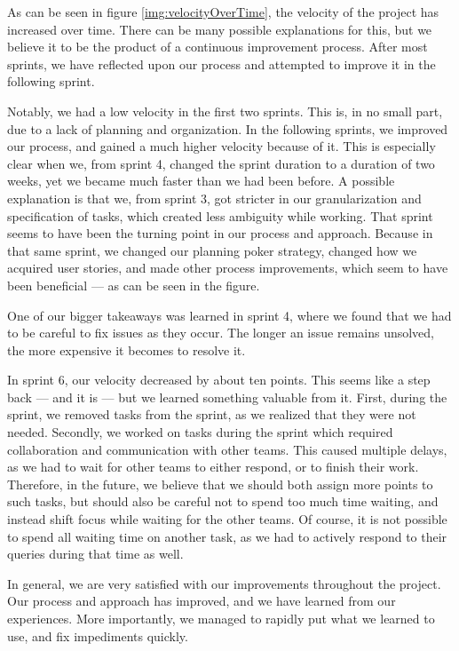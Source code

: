 As can be seen in figure \ref{img:velocityOverTime}, the velocity of the project has increased over time.
There can be many possible explanations for this, but we believe it to be the product of a continuous improvement process.
After most sprints, we have reflected upon our process and attempted to improve it in the following sprint.

Notably, we had a low velocity in the first two sprints. This is, in no small part, due to a lack of planning and organization. In the following sprints, we improved our process, and gained a much higher velocity because of it.
This is especially clear when we, from sprint 4, changed the sprint duration to a duration of two weeks, yet we became much faster than we had been before.
A possible explanation is that we, from sprint 3, got stricter in our granularization and specification of tasks, which created less ambiguity while working.
That sprint seems to have been the turning point in our process and approach. Because in that same sprint, we changed our planning poker strategy, changed how we acquired user stories, and made other process improvements, which seem to have been beneficial --- as can be seen in the figure.

One of our bigger takeaways was learned in sprint 4, where we found that we had to be careful to fix issues as they occur. The longer an issue remains unsolved, the more expensive it becomes to resolve it.

In sprint 6, our velocity decreased by about ten points. This seems like a step back --- and it is --- but we learned something valuable from it.
First, during the sprint, we removed tasks from the sprint, as we realized that they were not needed. 
Secondly, we worked on tasks during the sprint which required collaboration and communication with other teams. This caused multiple delays, as we had to wait for other teams to either respond, or to finish their work. Therefore, in the future, we believe that we should both assign more points to such tasks, but should also be careful not to spend too much time waiting, and instead shift focus while waiting for the other teams. Of course, it is not possible to spend all waiting time on another task, as we had to actively respond to their queries during that time as well.

In general, we are very satisfied with our improvements throughout the project. Our process and approach has improved, and we have learned from our experiences. More importantly, we managed to rapidly put what we learned to use, and fix impediments quickly.

